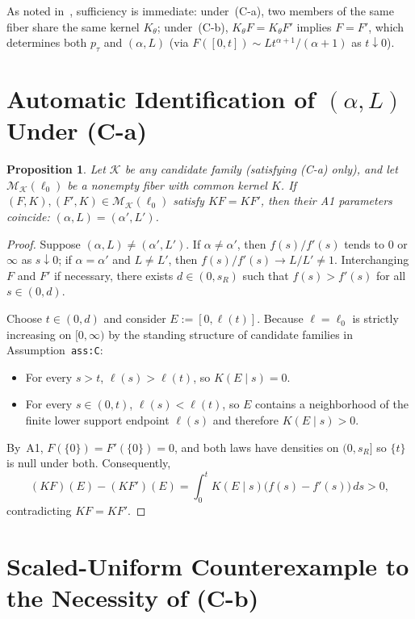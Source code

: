 \documentclass[11pt]{article}
\theoremstyle{plain}
\newtheorem{proposition}[theorem]{Proposition}
\theoremstyle{definition}
\theoremstyle{remark}
\begin{document}
As noted in~\cite{Qi2026}, sufficiency is immediate: under~\textup{(C-a)}, two members of the same fiber share the same kernel $K_\theta$; under~\textup{(C-b)}, $K_\theta F = K_\theta F'$ implies $F = F'$, which determines both $p_\tau$ and $(\alpha, L)$ (via $F([0, t]) \sim L t^{\alpha+1}/(\alpha+1)$ as $t \downarrow 0$).

\section{Automatic Identification of \texorpdfstring{$(\alpha, L)$}{(alpha, L)} Under (C-a)}

\begin{proposition}\label{prop:tail-ident}
Let $\mathcal{K}$ be any candidate family (satisfying \textup{(C-a)} only), and let $\mathcal{M}_{\mathcal{K}}(\ell_0)$ be a nonempty fiber with common kernel $K$. If $(F, K), (F', K) \in \mathcal{M}_{\mathcal{K}}(\ell_0)$ satisfy $KF = KF'$, then their \textup{A1} parameters coincide: $(\alpha, L) = (\alpha', L')$.
\end{proposition}

\begin{proof}
Suppose $(\alpha, L) \neq (\alpha', L')$.
If $\alpha \neq \alpha'$, then $f(s)/f'(s)$ tends to $0$ or $\infty$ as $s \downarrow 0$; if $\alpha = \alpha'$ and $L \neq L'$, then $f(s)/f'(s) \to L/L' \neq 1$.
Interchanging $F$ and $F'$ if necessary, there exists $d \in (0, s_R)$ such that $f(s) > f'(s)$ for all $s \in (0, d)$.

Choose $t \in (0, d)$ and consider $E := [0, \ell(t)]$.
Because $\ell = \ell_0$ is strictly increasing on $[0, \infty)$ by the standing structure of candidate families in Assumption~\texttt{ass:C}:
\begin{itemize}[leftmargin=1.6em]
\item For every $s > t$, $\ell(s) > \ell(t)$, so $K(E \mid s) = 0$.
\item For every $s \in (0, t)$, $\ell(s) < \ell(t)$, so $E$ contains a neighborhood of the finite lower support endpoint $\ell(s)$ and therefore $K(E \mid s) > 0$.
\end{itemize}
By~A1, $F(\{0\}) = F'(\{0\}) = 0$, and both laws have densities on $(0, s_R]$ so $\{t\}$ is null under both. Consequently,
\[
(KF)(E) - (KF')(E) = \int_0^t K(E \mid s)\bigl(f(s) - f'(s)\bigr)\,ds > 0,
\]
contradicting $KF = KF'$.
\end{proof}

\section{Scaled-Uniform Counterexample to the Necessity of (C-b)}
\end{document}
